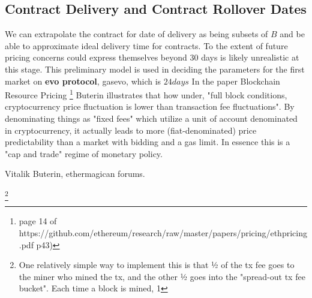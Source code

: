 \subsection{Contract Delivery and Contract Rollover Dates}
    \vspace{2mm}
We can extrapolate the contract for date of delivery as being subsets of $B$ and be able to 
approximate ideal delivery time for contracts. To the extent of future pricing concerns could 
express themselves beyond 30 days is  likely unrealistic at this stage. 
    \vspace{2mm}
This preliminary model is used in deciding the parameters for the first market on \textbf{evo 
protocol}, gasevo, which is $24 days$
    \vspace{2mm}
In the paper Blockchain Resource Pricing \footnote{page 14 of https://github.com/ethereum/research/raw/master/papers/pricing/ethpricing.pdf p43)} Buterin
illustrates that how under, "full block conditions, cryptocurrency price fluctuation is lower than
transaction fee fluctuations". By denominating things as "fixed fees" which utilize a unit of
account denominated in cryptocurrency, it actually leads to more (fiat-denominated) price
predictability than a market with bidding and a gas limit. In essence this is a "cap and trade" regime of monetary policy. 
    \vspace{2mm}


 Vitalik Buterin, ethermagican forums. 
    \vspace{2mm}

\footnote{ One relatively simple way to implement this is that ½ of the tx fee goes to the miner
who mined the tx, and the other ½ goes into the "spread-out tx fee bucket". Each time a block is
mined, 1%
}

